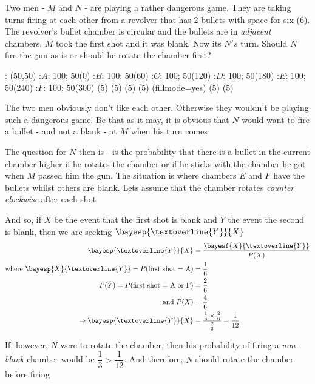 

\question Two men - $M$ and $N$ - are playing a rather dangerous game. They are taking
turns firing at each other from a revolver that has 2 bullets with space for six (6). 
The revolver's bullet chamber is circular and the bullets are in \textit{adjacent} chambers.
$M$ took the first shot and it was blank. Now its $N's$ turn. Should $N$ fire the gun as-is
or should he rotate the chamber first? 


\ifprintanswers
  \begin{marginfigure}
      : (50,50)
       :$A$: 100; 50(0)
       :$B$: 100; 50(60)
       :$C$: 100; 50(120)
       :$D$: 100; 50(180)
       :$E$: 100; 50(240)
       :$F$: 100; 50(300)
    \figdrawbegin{}
       (5)
       (5)
       (5)
       (5)
      \figset (fillmode=yes)
       (5)
       (5)
    \figdrawend
    \centerline{\box\figBoxA}
  \end{marginfigure}
\fi 

\begin{solution}
	The two men obviously don't like each other. Otherwise they wouldn't be playing such 
	a dangerous game. Be that as it may, it is obvious that $N$ would want to fire a bullet - and not a 
	blank - at $M$ when his turn comes
	
	The question for $N$ then is - is the probability that there is a bullet in the current
	chamber higher if he rotates the chamber or if he sticks with the chamber he got when $M$
	passed him the gun. The situation is \asif where chambers $E$ and $F$ have the bullets whilst 
	others are blank. Lets assume that the chamber rotates \textit{counter clockwise} after each shot
	
	And so, if $X$ be the event that the first shot is blank and $Y$ the event the second
	is blank, then we are seeking $\bayesp{\textoverline{Y}}{X}$
	\begin{align}
		\bayesp{\textoverline{Y}}{X} &= \dfrac{\bayesf{X}{\textoverline{Y}}}{P(X)} \\
		\text{where }\bayesp{X}{\textoverline{Y}} = P(\text{first shot = A}) &= \dfrac{1}{6} \\
		P(\overline{Y}) = P(\text{first shot = A or F}) &= \dfrac{2}{6} \\
		\text{and } P(X) &= \dfrac{4}{6} \\
		\Rightarrow \bayesp{\textoverline{Y}}{X} &= \dfrac{\frac{1}{6}\times\frac{2}{6}}{\frac{2}{3}} = \dfrac{1}{12}
	\end{align}
	
	If, however, $N$ were to rotate the chamber, then his probability of firing a \textit{non-blank} 
	chamber would be $\dfrac{1}{3} > \dfrac{1}{12}$. And therefore, $N$ should rotate the chamber before firing
	
\end{solution}
